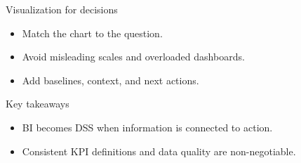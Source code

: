 \documentclass[aspectratio=169,11pt]{beamer}
\begin{document}
\begin{frame}{Visualization for decisions}
  \begin{itemize}
    \item Match the chart to the question.
    \item Avoid misleading scales and overloaded dashboards.
    \item Add baselines, context, and next actions.
  \end{itemize}
\end{frame}


\begin{frame}{Key takeaways}
  \begin{itemize}
    \item BI becomes DSS when information is connected to action.
    \item Consistent KPI definitions and data quality are non-negotiable.
  \end{itemize}
\end{frame}
\end{document}
